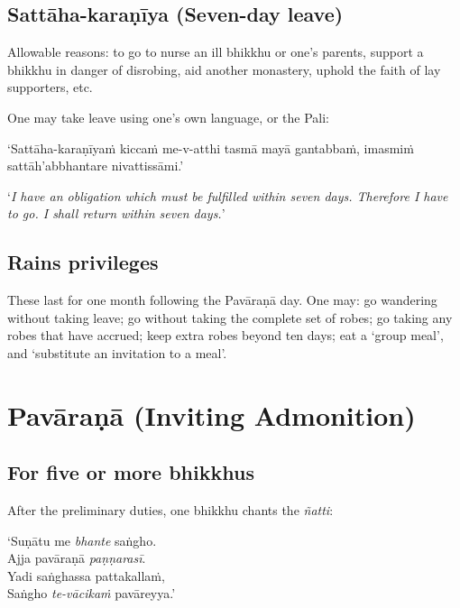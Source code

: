 \subsection{Sattāha-karaṇīya (Seven-day leave)}

Allowable reasons: to go to nurse an ill bhikkhu or one's parents, support a
bhikkhu in danger of disrobing, aid another monastery, uphold the faith of lay
supporters, etc.

One may take leave using one's own language, or the Pali:

‘Sattāha-karaṇīyaṁ kiccaṁ me-v-atthi tasmā mayā gantabbaṁ, imasmiṁ
sattāh'abbhantare nivattissāmi.’

‘\emph{I have an obligation which must be fulfilled within seven days. Therefore
  I have to go. I shall return within seven days.}’\\
\mbox{}

\subsection{Rains privileges}
\label{rains-privileges}

These last for one month following the Pavāraṇā day. One may: go wandering
without taking leave; go without taking the complete set of robes; go taking any
robes that have accrued; keep extra robes beyond ten days; eat a ‘group meal’,
and ‘substitute an invitation to a meal’.

\section{Pavāraṇā (Inviting Admonition)}

\subsection{For five or more bhikkhus}

After the preliminary duties, one bhikkhu chants the \emph{ñatti}:

\vspace*{\parskip}

\begin{paritta}
‘Suṇātu me \emph{bhante} saṅgho.\\
Ajja pavāraṇā \emph{paṇṇarasī}.\\
Yadi saṅghassa pattakallaṁ,\\
Saṅgho \emph{te-vācikaṁ} pavāreyya.’
\end{paritta}

